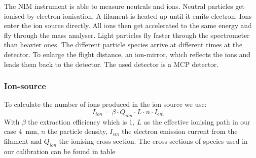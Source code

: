 	The NIM instrument is able to measure neutrals and ions. Neutral particles get ionised by electron ionisation. A filament is heated up until it emits electron. Ions enter the ion source directly.  %
	All ions then get accelerated to the same energy and fly through the mass analyser. Light particles fly faster through the spectrometer than heavier ones. The different particle species arrive at different times at the detector. To enlarge the flight distance, an ion-mirror, which reflects the ions and leads them back to the detector. The used detector is a MCP detector. %
	
		\subsubsection{Ion-source}
		To calculate the number of ions produced in the ion source we use:
		\begin{equation}
		I_{ion} = \beta\cdot Q_{ion}\cdot L\cdot n\cdot I_{em}
		\end{equation}
		With $\beta$ the extraction efficiency which is 1, %
		$L$ as the effective ionising path in our case 4~\si{\milli\metre}, $n$ the particle density, $I_{em}$ the electron emission current from the filament and $Q_{ion}$ the ionising cross section. The cross sections of species used in our calibration can be found in table %
		
		
		
	
